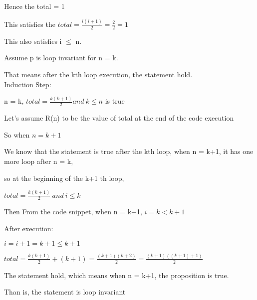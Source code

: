 \documentclass{article}
\begin{document}
\begin{large}
  Hence the total = 1
  
  This satisfies the $total = \frac{i(i+1)}{2} = \frac{2}{2} = 1$
  
  This also satisfies i $\le$ n.

Assume p is loop invariant for n = k.

That means after the kth loop execution, the statement hold.\\

\noindent Induction Step:

 n = k, $total = \frac{k(k+1)}{2} and\ k \le n$ is true

Let's assume R(n) to be the 
value of total at the end of the code execution

So when $n=k+1$

We know that the statement is true after the kth loop, when n = k+1, it has one more loop after n = k, 

so at the beginning of the k+1 th loop,

 $total = \frac{k(k+1)}{2}\ and\ i\le k$ 

Then 
From the code snippet, when n = k+1,
$ i = k < k+1$

After execution:

$ i = i+1 = k+1 \le k+1$

$total = \frac{k(k+1)}{2} + (k+1)=\frac{(k+1)(k+2)}{2} = \frac{(k+1)((k+1)+1)}{2}$

The statement hold, which means when n = k+1, the proposition is true.

Than is, the statement is loop invariant


\end{large}
\end{document}
